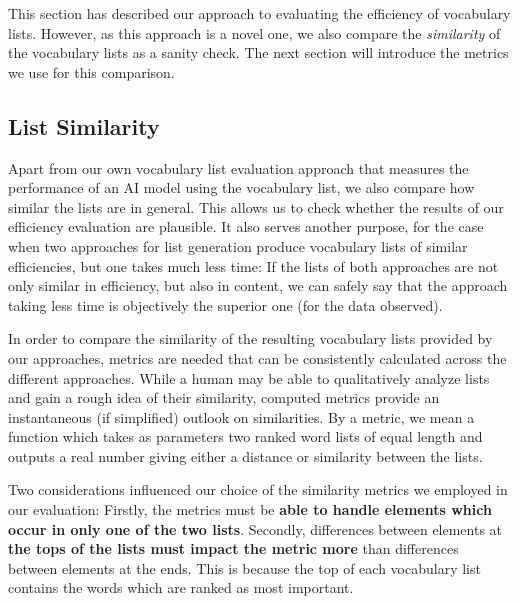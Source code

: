 This section has described our approach to evaluating the efficiency of vocabulary lists.
However, as this approach is a novel one, we also compare the \textit{similarity} of the vocabulary lists as a sanity check.
The next section will introduce the metrics we use for this comparison.

\subsection{List Similarity} \label{sec:list-similarity-measure}
Apart from our own vocabulary list evaluation approach that measures the performance of an AI model using the vocabulary list, we also compare how similar the lists are in general.
This allows us to check whether the results of our efficiency evaluation are plausible.
It also serves another purpose, for the case when two approaches for list generation produce vocabulary lists of similar efficiencies, but one takes much less time:
If the lists of both approaches are not only similar in efficiency, but also in content, we can safely say that the approach taking less time is objectively the superior one (for the data observed).

In order to compare the similarity of the resulting vocabulary lists provided by our approaches, metrics are needed that can be consistently calculated across the different approaches.
While a human may be able to qualitatively analyze lists and gain a rough idea of their similarity, computed metrics provide an instantaneous (if simplified) outlook on similarities.
By a metric, we mean a function which takes as parameters two ranked word lists of equal length and outputs a real number giving either a distance or similarity between the lists.

Two considerations influenced our choice of the similarity metrics we employed in our evaluation:
Firstly, the metrics must be \textbf{able to handle elements which occur in only one of the two lists}.
Secondly, differences between elements at \textbf{the tops of the lists must impact the metric more} than differences between elements at the ends.
This is because the top of each vocabulary list contains the words which are ranked as most important.

